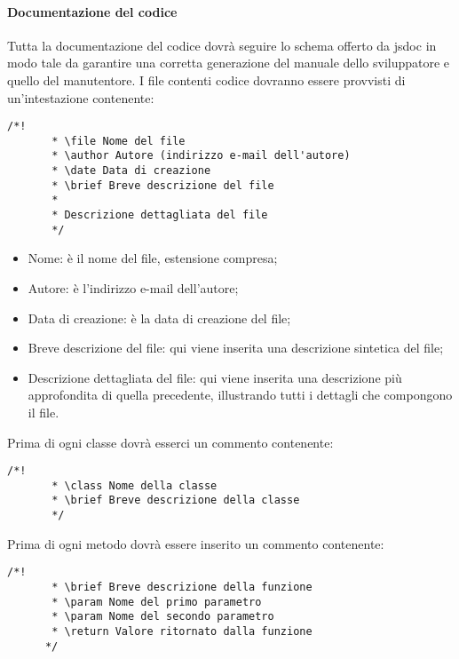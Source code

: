    \paragraph{Documentazione del codice}
     Tutta la documentazione del codice dovrà seguire lo schema offerto da jsdoc in modo tale da garantire
     una corretta generazione del manuale dello sviluppatore e quello del manutentore.
     I file contenti codice dovranno essere provvisti di un'intestazione contenente:
     \begin{lstlisting}[frame=single]
       /*!
       * \file Nome del file
       * \author Autore (indirizzo e-mail dell'autore)
       * \date Data di creazione
       * \brief Breve descrizione del file
       *
       * Descrizione dettagliata del file
       */
     \end{lstlisting}
     \begin{itemize}
     \item Nome: è il nome del file, estensione compresa;
     \item Autore: è l'indirizzo e-mail dell'autore;
     \item Data di creazione: è la data di creazione del file;
     \item Breve descrizione del file: qui viene inserita una descrizione sintetica del file;
     \item Descrizione dettagliata del file: qui viene inserita una descrizione più approfondita di quella precedente, illustrando tutti i dettagli che compongono il file.
     \end{itemize}
     Prima di ogni classe dovrà esserci un commento contenente:
     \begin{lstlisting}[frame=single]
       /*!
       * \class Nome della classe
       * \brief Breve descrizione della classe
       */
     \end{lstlisting}

     Prima di ogni metodo dovrà essere inserito un commento contenente:
     \begin{lstlisting}[frame=single]
       /*!
       * \brief Breve descrizione della funzione
       * \param Nome del primo parametro
       * \param Nome del secondo parametro
       * \return Valore ritornato dalla funzione
      */
  \end{lstlisting}

